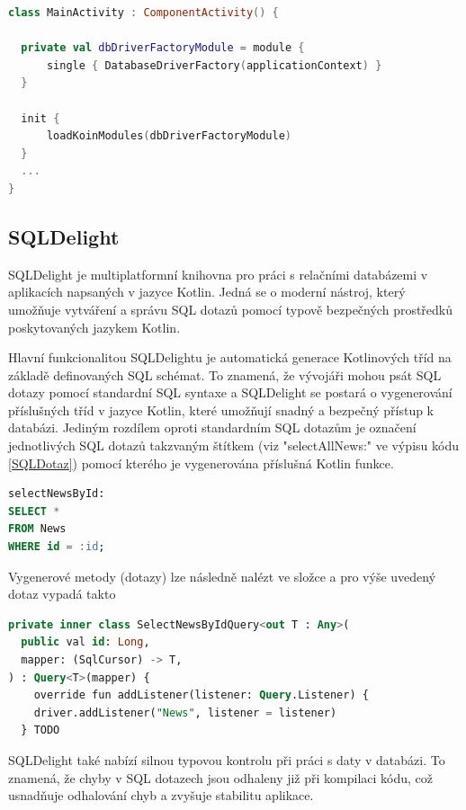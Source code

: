 \begin{lstlisting}[caption={DI databázového ovladače pomocí Koinu}, label={lst:KoinInit}, language=Kotlin]
class MainActivity : ComponentActivity() {

  private val dbDriverFactoryModule = module {
      single { DatabaseDriverFactory(applicationContext) }
  }

  init {
      loadKoinModules(dbDriverFactoryModule)
  }
  ...
}
\end{lstlisting}

\subsection{SQLDelight}
SQLDelight je multiplatformní knihovna pro práci s relačními databázemi v aplikacích napsaných v jazyce Kotlin. Jedná se o moderní nástroj, 
který umožňuje vytváření a správu SQL dotazů pomocí typově bezpečných prostředků poskytovaných jazykem Kotlin.

Hlavní funkcionalitou SQLDelightu je automatická generace Kotlinových tříd na základě definovaných SQL schémat. To znamená, že vývojáři
 mohou psát SQL dotazy pomocí standardní SQL syntaxe a SQLDelight se postará o vygenerování příslušných tříd v jazyce Kotlin, které umožňují 
 snadný a bezpečný přístup k databázi. Jediným rozdílem oproti standardním SQL dotazům je označení jednotlivých SQL dotazů takzvaným 
 štítkem (viz "selectAllNews:" ve výpisu kódu \ref{SQLDotaz}) pomocí kterého je vygenerována příslušná Kotlin funkce. 

\begin{lstlisting}[caption={SQL dotaz}, label={lst:SQLDotaz}, language=SQL]
selectNewsById:
SELECT *
FROM News
WHERE id = :id;
\end{lstlisting}

Vygenerové metody (dotazy) lze následně nalézt ve složce \code{} a pro výše uvedený dotaz vypadá takto

\begin{lstlisting}[caption={SQL vygenerovaný dotaz}, label={lst:SQLGeneratedDotaz}, language=SQL]
private inner class SelectNewsByIdQuery<out T : Any>(
  public val id: Long,
  mapper: (SqlCursor) -> T,
) : Query<T>(mapper) {
    override fun addListener(listener: Query.Listener) {
    driver.addListener("News", listener = listener)
  } TODO
  \end{lstlisting}
  

SQLDelight také nabízí silnou typovou kontrolu při práci s daty v databázi. To znamená, že chyby v SQL dotazech jsou odhaleny již při
 kompilaci kódu, což usnadňuje odhalování chyb a zvyšuje stabilitu aplikace.

